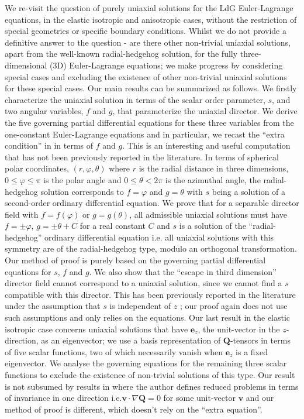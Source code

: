 \documentclass[10pt, a4paper]{article}
\begin{document}
We re-visit the question of purely uniaxial solutions for the LdG Euler-Lagrange equations, in the elastic isotropic and anisotropic cases, without the restriction of special geometries or specific boundary conditions.
Whilst we do not provide a definitive answer to the question - are there other non-trivial uniaxial solutions, apart from the well-known radial-hedgehog solution, for the fully three-dimensional (3D) Euler-Lagrange equations; we make progress by considering special cases and excluding the existence of other non-trivial uniaxial solutions for these special cases. Our main results can be summarized as follows. We firstly characterize the uniaxial solution in terms of the scalar order parameter, $s$, and two angular variables, $f$ and $g$, that parameterize the uniaxial director. We derive the five governing partial differential equations for these three variables from the one-constant Euler-Lagrange equations and in particular, we recast the ``extra condition'' in \cite{lamy2015uniaxial} in terms of $f$ and $g$. This is an interesting and useful computation that has not been previously reported in the literature. In terms of spherical polar coordinates, $\left(r, \varphi, \theta \right)$ where $r$ is the radial distance in three dimensions, $0\leq \varphi\leq \pi$ is the polar angle and $0\leq \theta < 2\pi$ is the azimuthal angle, the radial-hedgehog solution corresponds to $f = \varphi$ and $ g = \theta$ with $s$ being a solution of a second-order ordinary differential equation. We prove that for a separable director field with $f = f(\varphi)$ or $g = g(\theta)$, all admissible uniaxial solutions must have $f=\pm \varphi$, $g=\pm \theta + C$ for a real constant $C$ and $s$ is a solution of the ``radial-hedgehog'' ordinary differential equation i.e. all uniaxial solutions with this symmetry are of the radial-hedgehog type, modulo an orthogonal transformation. Our method of proof %
is purely based on the governing partial differential equations for $s$, $f$ and $g$. 
We also show that the ``escape in third dimension'' director field cannot correspond to a uniaxial solution, since we cannot find a $s$ compatible with this director. This has been previously reported in the literature under the assumption that $s$ is independent of $z$ \cite{lamy2015uniaxial}; our proof again does not use such assumptions and only relies on the equations. Our last result in the elastic isotropic case concerns uniaxial solutions that have $\mathbf{e}_z$, the unit-vector in the $z$-direction, as an eigenvector; we use a basis representation of $\mathbf{Q}$-tensors in terms of five scalar functions, two of which necessarily vanish when $\mathbf{e}_z$ is a fixed eigenvector. We analyse the governing equations for the remaining three scalar functions to exclude the existence of non-trivial solutions of this type. Our result is not subsumed by results in \cite{lamy2015uniaxial} where the author defines reduced problems in terms of invariance in one direction i.e.$\mathbf{v} \cdot \nabla \mathbf{Q}=0$ for some unit-vector $\mathbf{v}$ and our method of proof is different, which doesn't rely on the ``extra equation''.
\end{document}
